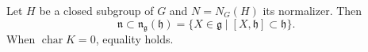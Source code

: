 Let $H$ be a closed subgroup of $G$ and $N = N_G(H)$ its normalizer. Then
$$\mathfrak{n} \subset \mathfrak{n}_{\mathfrak{g}}(\mathfrak{h}) = \{X \in \mathfrak{g} \mid [X, \mathfrak{h}] \subset \mathfrak{h}\}.$$
When $\operatorname{char} K = 0$, equality holds.
